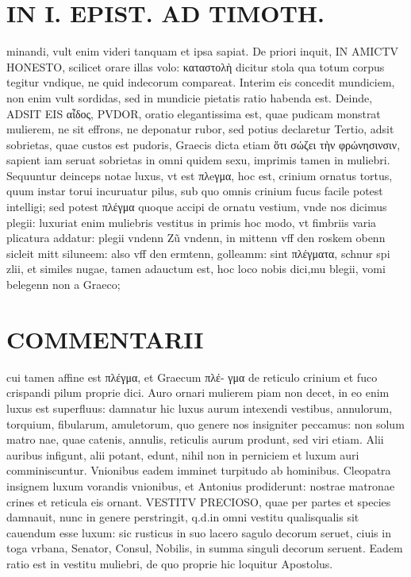 \documentclass{article}
\begin{document}
\begin{pages}
\section*{IN I. EPIST. AD TIMOTH. }
\marginpar{[ p.55 ]}\pstart minandi, vult enim videri tanquam et ipsa sapiat.  \pend\pstart De priori inquit, IN AMICTV HONESTO, scilicet orare illas volo: καταστολὴ dicitur stola qua totum corpus tegitur vndique, ne quid indecorum compareat. Interim eis concedit mundiciem, non enim vult sordidas, sed in mundicie pietatis ratio habenda est.  \pend\pstart Deinde, ADSIT EIS αἶδος, PVDOR, oratio elegantissima est, quae pudicam monstrat mulierem, ne sit effrons, ne deponatur rubor, sed potius declaretur  \pend\pstart Tertio, adsit sobrietas, quae custos est pudoris, Graecis dicta etiam ὅτι σώζει τὴν φρώνησινσιν, sapient iam seruat sobrietas in omni quidem sexu, imprimis tamen in muliebri.  \pend\pstart Sequuntur deinceps notae luxus, vt est πλeγμα, hoc est, crinium ornatus tortus, quum instar torui incuruatur pilus, sub quo omnis crinium fucus facile potest intelligi; sed potest πλέγμα quoque accipi de ornatu vestium, vnde nos dicimus plegii: luxuriat enim muliebris vestitus in primis hoc modo, vt fimbriis varia plicatura addatur: plegii vndenn Zũ vndenn, in mittenn vff den roskem obenn sicleit mitt siluneem: also vff den ermtenn, golleamm: sint πλέγματα, schnur spi zlii, et similes nugae, tamen adauctum est, hoc loco nobis dici,mu blegii, vomi belegenn non a Graeco;  \pend
\section*{COMMENTARII }
\marginpar{[ p.56 ]}\pstart cui tamen affine est πλέγμα, et Graecum πλέ- γμα de reticulo crinium et fuco crispandi pilum proprie dici.  \pend\pstart Auro ornari mulierem piam non decet, in eo enim luxus est superfluus: damnatur hic luxus aurum intexendi vestibus, annulorum, torquium, fibularum, amuletorum, quo genere nos insigniter peccamus: non solum matro nae, quae catenis, annulis, reticulis aurum produnt, sed viri etiam. Alii auribus infigunt, alii potant, edunt, nihil non in perniciem et luxum auri comminiscuntur.  \pend\pstart Vnionibus eadem imminet turpitudo ab hominibus. Cleopatra insignem luxum vorandis vnionibus, et Antonius prodiderunt: nostrae matronae crines et reticula eis ornant. VESTITV PRECIOSO, quae per partes et species damnauit, nunc in genere perstringit, q.d.in omni vestitu qualisqualis sit cauendum esse luxum: sic rusticus in suo lacero sagulo decorum seruet, ciuis in toga vrbana, Senator, Consul, Nobilis, in summa singuli decorum seruent. Eadem ratio est in vestitu muliebri, de quo proprie hic loquitur Apostolus.  \pend
{}
{}

\end{pages}
\end{document}
